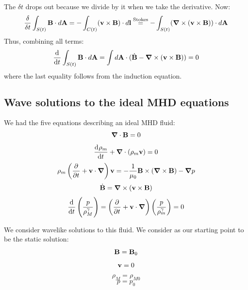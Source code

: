 The $\delta t$ drops out because we divide by it when we take the derivative. Now:
\begin{equation}
    \frac{\delta}{\delta t}\int_{S(t)}\v{B} \cdot d\v{A} = -\int_{C(t)} (\v{v} \times \v{B}) \cdot d\v{l} \stackrel{\text{Stokes}}{=} -\int_{S(t)}(\nabla \times (\v{v} \times \v{B}))\cdot d\v{A}
\end{equation}
Thus, combining all terms:
\begin{equation}
     \dod{}{t}\int_{S(t)}\v{B} \cdot d\v{A} = \int d\v{A} \cdot (\dot{\v{B}} - \nabla \times (\v{v} \times \v{B})) = 0
\end{equation}
where the last equality follows from the induction equation.

\subsection{Wave solutions to the ideal MHD equations}
We had the five equations describing an ideal MHD fluid:
\begin{equation}
    \nabla \cdot \v{B} = 0
\end{equation}
\begin{equation}
    \dod{\rho_m}{t} + \nabla \cdot (\rho_m \v{v}) = 0
\end{equation}
\begin{equation}
    \rho_m\left(\dpd{}{t} + \v{v} \cdot \nabla\right)\v{v} = -\frac{1}{\mu_0}\v{B} \times (\nabla \times \v{B}) - \nabla p
\end{equation}
\begin{equation}
    \dot{\v{B}} = \nabla \times (\v{v} \times\v{B})
\end{equation}
\begin{equation}
    \dod{}{t}\left(\frac{p}{\rho^\gamma_M}\right) = \left(\dpd{}{t} + \v{v} \cdot \nabla\right)\left(\frac{p}{\rho^\gamma_m}\right) = 0
\end{equation}

We consider wavelike solutions to this fluid. We consider as our starting point to be the static solution:
\begin{equation}
    \mathbf{B} = \mathbf{B}_0
\end{equation}
\begin{equation}
    \mathbf{v} = 0
\end{equation}
\begin{equation}
    \rho_M= \rho_{M0}
\end{equation}
\begin{equation}
    p = p_0
\end{equation}

